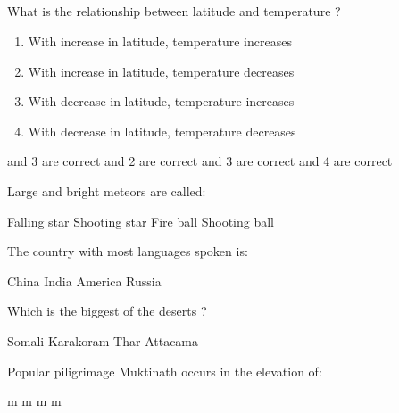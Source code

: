 
\subsection*{}

\begin{questions}

\question What is the relationship between latitude and temperature ?
  \begin{enumerate}
  \item With increase in latitude, temperature increases
  \item With increase in latitude, temperature decreases
  \item With decrease in latitude, temperature increases
  \item With decrease in latitude, temperature decreases
  \end{enumerate}

  \begin{choices}
   and 3 are correct
   and 2 are correct
   and 3 are correct
   and 4 are correct
  \end{choices}

\question Large and bright meteors are called:
  \begin{choices}
  \choice Falling star
  \choice Shooting star
  \CorrectChoice Fire ball
  \choice Shooting ball
  \end{choices}

\question The country with most languages spoken is:

  \begin{oneparchoices}
  \choice China
  \CorrectChoice India
  \choice America
  \choice Russia
  \end{oneparchoices}

\question Which is the biggest of the deserts ?

  \begin{oneparchoices}
  \choice Somali
  \CorrectChoice Karakoram
  \choice Thar
  \choice Attacama
  \end{oneparchoices}

\question Popular piligrimage Muktinath occurs in the elevation of:
  \begin{choices}
   m
   m
   m
   m
  \end{choices}


\end{questions}
